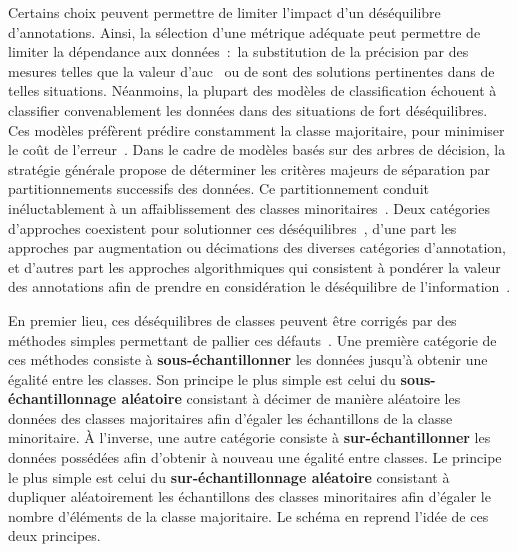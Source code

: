 Certains choix peuvent permettre de limiter l'impact d'un déséquilibre d'annotations. Ainsi, la sélection d'une métrique adéquate peut permettre de limiter la dépendance aux données~:~la substitution de la précision par des mesures telles que la valeur d'\gls{auc}~\cite{Celebi2007} ou de \fscore{} sont des solutions pertinentes dans de telles situations. Néanmoins, la plupart des modèles de classification échouent à classifier convenablement les données dans des situations de fort déséquilibres. Ces modèles préfèrent prédire constamment la classe majoritaire, pour minimiser le coût de l'erreur~\cite{Huang2013}. Dans le cadre de modèles basés sur des arbres de décision, la stratégie générale propose de déterminer les critères majeurs de séparation par partitionnements successifs des données. Ce partitionnement conduit inéluctablement à un affaiblissement des classes minoritaires~\cite{HaiboHe2009}. Deux catégories d'approches coexistent pour solutionner ces déséquilibres~\cite{Huang2013}, d'une part les approches par augmentation ou décimations des diverses catégories d'annotation, et d'autres part les approches algorithmiques qui consistent à pondérer la valeur des annotations afin de prendre en considération le déséquilibre de l'information~\cite{Ting2002,HaiboHe2009,ThaiNghe2010}.\par

En premier lieu, ces déséquilibres de classes peuvent être corrigés par des méthodes simples permettant de pallier ces défauts~\cite{Prati2009, HaiboHe2009}. Une première catégorie de ces méthodes consiste à \textbf{sous-échantillonner} les données jusqu'à obtenir une égalité entre les classes. Son principe le plus simple est celui du \textbf{sous-échantillonnage aléatoire} consistant à décimer de manière aléatoire les données des classes majoritaires afin d'égaler les échantillons de la classe minoritaire. À l'inverse, une autre catégorie consiste à \textbf{sur-échantillonner} les données possédées afin d'obtenir à nouveau une égalité entre classes. Le principe le plus simple est celui du \textbf{sur-échantillonnage aléatoire} consistant à dupliquer aléatoirement les échantillons des classes minoritaires afin d'égaler le nombre d'éléments de la classe majoritaire. Le schéma en  reprend l'idée de ces deux principes.\par

